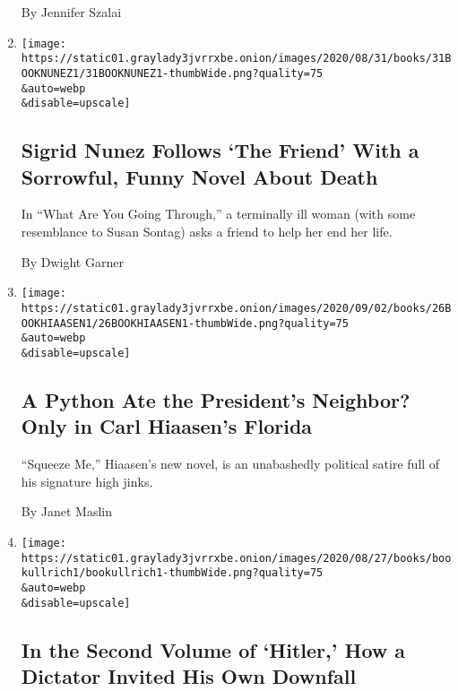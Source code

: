 \begin{enumerate}
  By Jennifer Szalai
\item
  \href{/2020/08/31/books/review-what-are-you-going-through-sigrid-nunez.html}{}

  \texttt{[image: https://static01.graylady3jvrrxbe.onion/images/2020/08/31/books/31BOOKNUNEZ1/31BOOKNUNEZ1-thumbWide.png?quality=75\\\&auto=webp\\\&disable=upscale]}

  \hypertarget{sigrid-nunez-follows-the-friend-with-a-sorrowful-funny-novel-about-death}{%
  \subsection{Sigrid Nunez Follows `The Friend' With a Sorrowful, Funny
  Novel About
  Death}\label{sigrid-nunez-follows-the-friend-with-a-sorrowful-funny-novel-about-death}}

  In ``What Are You Going Through,'' a terminally ill woman (with some
  resemblance to Susan Sontag) asks a friend to help her end her life.

  By Dwight Garner
\item
  \href{/2020/08/29/books/review-carl-hiaasen-squeeze-me.html}{}

  \texttt{[image: https://static01.graylady3jvrrxbe.onion/images/2020/09/02/books/26BOOKHIAASEN1/26BOOKHIAASEN1-thumbWide.png?quality=75\\\&auto=webp\\\&disable=upscale]}

  \hypertarget{a-python-ate-the-presidents-neighbor-only-in-carl-hiaasens-florida}{%
  \subsection{A Python Ate the President's Neighbor? Only in Carl
  Hiaasen's
  Florida}\label{a-python-ate-the-presidents-neighbor-only-in-carl-hiaasens-florida}}

  ``Squeeze Me,'' Hiaasen's new novel, is an unabashedly political
  satire full of his signature high jinks.

  By Janet Maslin
\item
  \href{/2020/08/26/books/review-hitler-downfall-volker-ullrich.html}{}

  \texttt{[image: https://static01.graylady3jvrrxbe.onion/images/2020/08/27/books/bookullrich1/bookullrich1-thumbWide.png?quality=75\\\&auto=webp\\\&disable=upscale]}

  \hypertarget{in-the-second-volume-of-hitler-how-a-dictator-invited-his-own-downfall}{%
  \subsection{In the Second Volume of `Hitler,' How a Dictator Invited
  His Own
  Downfall}\label{in-the-second-volume-of-hitler-how-a-dictator-invited-his-own-downfall}}


\end{enumerate}
